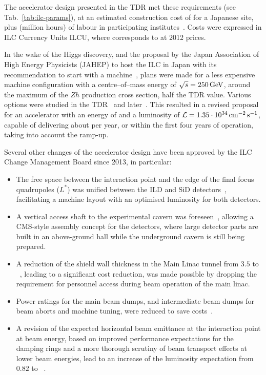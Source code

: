 The accelerator design presented in the TDR met these requirements (see Tab.~\ref{tab:ilc-params}), at an estimated construction cost of  for a Japanese site, plus  (million hours) of labour in participating institutes~\cite[Sec. 15.8.4]{Adolphsen:2013kya}. 
Costs were expressed in ILC Currency Units ILCU, where  corresponds to  at 2012 prices.

In the wake of the Higgs discovery, and the proposal by the Japan Association of High Energy Physicists (JAHEP) to host the ILC in Japan\cite{JAHEP:2012a} with its recommendation to start with a  machine~\cite{JAHEP:2012b}, plans were made for a less expensive machine configuration with a centre--of--mass energy of $\sqrt{s} = 250\,{\mathrm{GeV}}$, around the maximum of the $Zh$ production cross section, half the TDR value.
Various options were studied in the TDR~\cite[Sect. 12.5]{Adolphsen:2013kya} and later~\cite{Dugan:2014}.
This resulted in a revised proposal~\cite{Evans:2017rvt} for an accelerator with an energy of  and a luminosity of ${\mathcal{L}} = 1.35 \cdot 10^{34}\,{\mathrm{cm^{-2}\,s^{-1}}}$, capable of delivering about  per year, or  within the first four years of operation, taking into account the ramp-up.

Several other changes of the accelerator design have been approved by the ILC Change Management Board since 2013, in particular:
\begin{itemize}
\item The free space between the interaction point and the edge of the final focus quadrupoles ($L^*$) was unified between the ILD and SiD detectors~\cite{bib:cr-0002}, facilitating a machine layout with an optimised luminosity for both detectors. 
\item A vertical access shaft to the experimental cavern was foreseen~\cite{bib:cr-0003}, allowing a CMS-style assembly concept for the detectors, where large detector parts are built in an above-ground hall while the underground cavern is still being prepared. 
\item A reduction of the shield wall thickness in the Main Linac tunnel from $3.5$ to ~\cite{bib:cr-0012}, leading to a significant cost reduction, was made possible by dropping the requirement for personnel access during beam operation of the main linac.
\item Power ratings for the main beam dumps, and intermediate beam dumps for beam aborts and machine tuning, were reduced to save costs~\cite{bib:cr-0013}.
\item A revision of the expected horizontal beam emittance at the interaction point at  beam energy, based on improved performance expectations for the damping rings and a more thorough scrutiny of beam transport effects at lower beam energies, lead to an increase of the luminosity expectation from $0.82$ to ~\cite{bib:cr-0016}.
\end{itemize}

